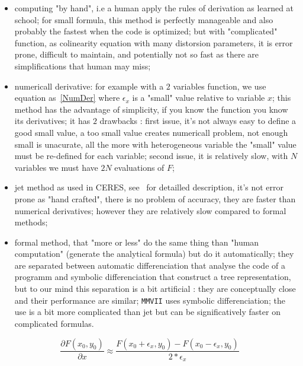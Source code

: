 \begin{itemize}
    \item  computing "by hand", i.e a human apply the rules of derivation as
           learned at school;  for small formula, this method is perfectly manageable 
           and also probably the fastest when the code is optimized;
           but with "complicated" function, as colinearity equation with many distorsion parameters,
           it is error prone, difficult to maintain, and potentially not so fast as there
           are simplifications that human may miss;

    \item  numericall derivative: for example with a $2$ variables function, we use equation as~\ref{NumDer}
           where $\epsilon_x$ is a "small" value relative to variable $x$;
           this method has the advantage of simplicity, if you know the function you know its derivatives;
           it has $2$ drawbacks :  first issue, it's not always easy to define a good small value, a too small value
           creates numericall problem, not enough small is unacurate, all the more with heterogeneous variable the "small"
            value must be re-defined for each variable;  second issue, it is relatively slow, with $N$  variables
           we must have $2N$ evaluations of $F$;

     \item jet method as used in CERES, see~\cite{CERES} for detailled description, it's not error
           prone as "hand crafted", there is no problem of accuracy, they are faster than 
           numerical derivatives; however they are relatively slow compared to formal methods;

   \item formal method, that "more or less" do the same thing than "human computation" (generate the
	   analytical formula) but do
           it automatically; they are separated between automatic differenciation that analyse the code of a programm
           and symbolic differenciation that construct a tree representation, but to our mind this separation
           is a bit artificial : they are conceptually close and 
           their performance are similar;  {\tt MMVII} uses symbolic differenciation;
           the use is a bit more complicated than jet but can be significatively faster  on complicated
           formulas.
\end{itemize}

\begin{equation}
    \frac{\partial F(x_0,y_0)}{\partial x} \approx \frac{F(x_0 + \epsilon_x,y_0) - F(x_0-\epsilon_x,y_0)}{2* \epsilon_x}
     \label{NumDer}
\end{equation}

